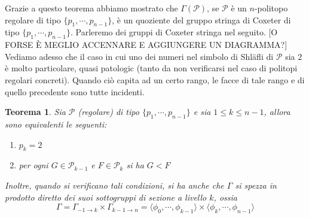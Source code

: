 \documentclass[a4paper,12pt]{report}
\newcommand{\p}{\mathcal{P}}
\theoremstyle{plain}
\newtheorem{teo}{Teorema}[chapter]
\theoremstyle{definition}
\newcommand\locallabel[1]{\label{\currentprefix_#1}}
\begin{document}
Grazie a questo teorema abbiamo mostrato che $\Gamma(\p)$, se $\p$ \`e un $n$-politopo regolare di tipo $\{p_1,\cdots,p_{n-1}\}$, \`e un quoziente
del gruppo stringa di Coxeter di tipo $\{p_1,\cdots,p_{n-1}\}$. Parleremo dei gruppi di Coxeter stringa nel seguito. [O FORSE \`E MEGLIO ACCENNARE
E AGGIUNGERE UN DIAGRAMMA?]\\
Vediamo adesso che il caso in cui uno dei numeri nel simbolo di Shl\"afli di $\p$ sia $2$ \`e molto particolare, quasi patologic (tanto da non
verificarsi nel caso di politopi regolari concreti). Quando ci\`o capita ad un certo rango, le facce di tale rango e di quello precedente sono
tutte incidenti.
\begin{teo}
\label{teo:ReducibleDiagram}
\def\currentprefix{teo:ReducibleDiagram}
Sia $\p$ (regolare) di tipo $\{p_1,\cdots,p_{n-1}\}$ e sia $1\leq k\leq n-1$, allora sono equivalenti le seguenti:
\begin{enumerate}
\item\locallabel{1}$p_k=2$
\item\locallabel{2}per ogni $G\in\p_{k-1}$ e $F\in\p_k$ si ha $G<F$
\end{enumerate}
Inoltre, quando si verificano tali condizioni, si ha anche che $\Gamma$ si spezza in prodotto diretto dei suoi sottogruppi di sezione
a livello $k$, ossia
\begin{equation}
\locallabel{3}
\Gamma=\Gamma_{-1\rightarrow k}\times\Gamma_{k-1\rightarrow n}=\langle\phi_0,\cdots,\phi_{k-1}\rangle\times\langle\phi_k,\cdots,\phi_{n-1}\rangle\tag{3}
\end{equation}
\end{teo}
\end{document}
